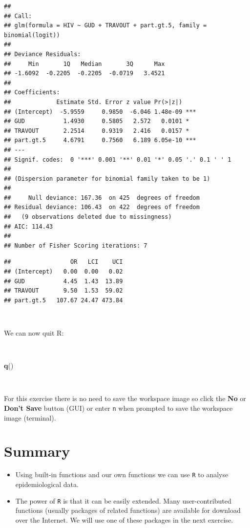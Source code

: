 \documentclass[12pt,a4paper]{book}
\newenvironment{Shaded}{\begin{snugshade}}{\end{snugshade}}
\newcommand{\KeywordTok}[1]{\textcolor[rgb]{0.13,0.29,0.53}{\textbf{#1}}}
\newcommand{\NormalTok}[1]{#1}
\theoremstyle{definition}
\theoremstyle{definition}
\theoremstyle{definition}
\theoremstyle{remark}
\begin{document}
\begin{verbatim}
## 
## Call:
## glm(formula = HIV ~ GUD + TRAVOUT + part.gt.5, family = binomial(logit))
## 
## Deviance Residuals: 
##     Min       1Q   Median       3Q      Max  
## -1.6092  -0.2205  -0.2205  -0.0719   3.4521  
## 
## Coefficients:
##             Estimate Std. Error z value Pr(>|z|)    
## (Intercept)  -5.9559     0.9850  -6.046 1.48e-09 ***
## GUD           1.4930     0.5805   2.572   0.0101 *  
## TRAVOUT       2.2514     0.9319   2.416   0.0157 *  
## part.gt.5     4.6791     0.7560   6.189 6.05e-10 ***
## ---
## Signif. codes:  0 '***' 0.001 '**' 0.01 '*' 0.05 '.' 0.1 ' ' 1
## 
## (Dispersion parameter for binomial family taken to be 1)
## 
##     Null deviance: 167.36  on 425  degrees of freedom
## Residual deviance: 106.43  on 422  degrees of freedom
##   (9 observations deleted due to missingness)
## AIC: 114.43
## 
## Number of Fisher Scoring iterations: 7
\end{verbatim}

\begin{verbatim}
##                 OR   LCI    UCI
## (Intercept)   0.00  0.00   0.02
## GUD           4.45  1.43  13.89
## TRAVOUT       9.50  1.53  59.02
## part.gt.5   107.67 24.47 473.84
\end{verbatim}

~

We can now quit R:

~

\begin{Shaded}
\begin{Highlighting}[]
\KeywordTok{q}\NormalTok{()}
\end{Highlighting}
\end{Shaded}

~

For this exercise there is no need to save the workspace image so click
the \textbf{No} or \textbf{Don't Save} button (GUI) or enter \texttt{n}
when prompted to save the workspace image (terminal).

\hypertarget{summary-3}{%
\section{Summary}\label{summary-3}}

\begin{itemize}
\item
  Using built-in functions and our own functions we can use \texttt{R}
  to analyse epidemiological data.
\item
  The power of \texttt{R} is that it can be easily extended. Many
  user-contributed functions (usually packages of related functions) are
  available for download over the Internet. We will use one of these
  packages in the next exercise.
\end{itemize}
\end{document}

